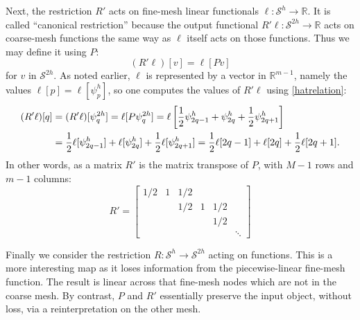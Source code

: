 \documentclass[letterpaper,final,12pt,reqno]{amsart}
\newcommand{\RR}{\mathbb{R}}
\begin{document}
Next, the restriction $R'$ acts on fine-mesh linear functionals $\ell:\mathcal{S}^h \to \RR$.  It is called ``canonical restriction'' \cite{GraeserKornhuber2009} because the output functional $R'\ell:\mathcal{S}^{2h}\to \RR$ acts on coarse-mesh functions the same way as $\ell$ itself acts on those functions.  Thus we may define it using $P$:
\begin{equation}
  (R'\ell)[v] = \ell[Pv]  \label{rprimedefinition}
\end{equation}
for $v$ in $\mathcal{S}^{2h}$.  As noted earlier, $\ell$ is represented by a vector in $\RR^{m-1}$, namely the values $\ell[p] = \ell[\psi_p^h]$, so one computes the values of $R'\ell$ using \eqref{hatrelation}:
\begin{align}
  (R'\ell)[q] &= (R'\ell)[\psi_q^{2h}] = \ell[P\psi_q^{2h}] = \ell\left[\frac{1}{2} \psi_{2q-1}^h + \psi_{2q}^h + \frac{1}{2} \psi_{2q+1}^h\right]  \label{rprimeformula} \\
      &= \frac{1}{2} \ell[\psi_{2q-1}^h] + \ell[\psi_{2q}^h] + \frac{1}{2} \ell[\psi_{2q+1}^h] = \frac{1}{2} \ell[2q-1] + \ell[2q] + \frac{1}{2} \ell[2q+1].  \notag
\end{align}
In other words, as a matrix $R'$ is the matrix transpose of $P$, with $M-1$ rows and $m-1$ columns:
\begin{equation}
R' = \begin{bmatrix}
1/2 & 1 & 1/2 &   &     & \\
    &   & 1/2 & 1 & 1/2 & \\
    &   &     &   & 1/2 & \\
    &   &     &   &     & \ddots
\end{bmatrix} \label{rprimematrix}
\end{equation}

Finally we consider the restriction $R:\mathcal{S}^h\to\mathcal{S}^{2h}$ acting on functions.  This is a more interesting map as it loses information from the piecewise-linear fine-mesh function.  The result is linear across that fine-mesh nodes which are not in the coarse mesh.  By contrast, $P$ and $R'$ essentially preserve the input object, without loss, via a reinterpretation on the other mesh.

\newcommand{\Rpr}{R_{\text{pr}}}
\newcommand{\Rin}{R_{\text{in}}}
\newcommand{\Rfw}{R_{\text{fw}}}
\end{document}
